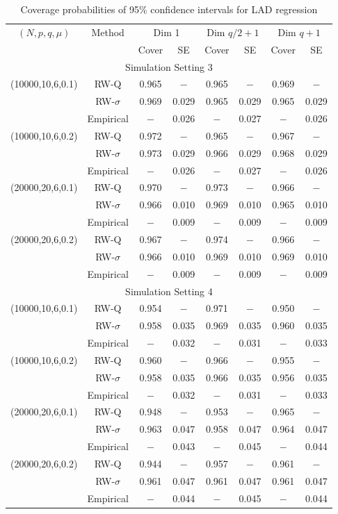 \documentclass[twoside,11pt]{article}
\begin{document}
\begin{table}[!h]
	\centering
	\caption{Coverage probabilities of 95\% confidence intervals for LAD regression}
	\medskip
	\label{tab:sim3}
	\begin{tabular}{cccccccc}
		\hline
		$(N, p, q, \mu)$ & Method & \multicolumn{2}{c}{Dim 1} & \multicolumn{2}{c}{Dim $q/2+1$} & \multicolumn{2}{c}{Dim $q+1$}\\
		& & Cover& SE& Cover& SE & Cover& SE\\
		\hline\hline
		\multicolumn{8}{c}{Simulation Setting 3}\\
		\hline
		(10000,10,6,0.1) & RW-Q & 0.965&$-$ &0.965&$-$ &0.969&$-$\\
		& RW-$\sigma$ & 0.969&0.029 &0.965& 0.029&0.965& 0.029\\
		& Empirical & $-$& 0.026&$-$ & 0.027&$-$& 0.026\\
		\hline
		(10000,10,6,0.2) &  RW-Q &0.972 & $-$&0.965 & $-$&0.967&$-$\\
		& RW-$\sigma$ & 0.973& 0.029& 0.966& 0.029&0.968 & 0.029\\
		& Empirical & $-$& 0.026&$-$ & 0.027&$-$& 0.026\\
		\hline
		(20000,20,6,0.1) & RW-Q & 0.970& $-$ &0.973 &$-$ &0.966 &$-$\\
		& RW-$\sigma$ & 0.966& 0.010&0.969 & 0.010&0.965& 0.010\\
		& Empirical & $-$& 0.009&$-$ & 0.009&$-$& 0.009\\
		\hline
		(20000,20,6,0.2)& RW-Q & 0.967& $-$&0.974& $-$ & 0.966&$-$\\
		& RW-$\sigma$ & 0.966& 0.010& 0.969& 0.010&0.969 & 0.010\\
		& Empirical & $-$& 0.009&$-$ & 0.009&$-$& 0.009\\
		\hline
		\multicolumn{8}{c}{Simulation Setting 4}\\
		\hline
		(10000,10,6,0.1) & RW-Q & 0.954&$-$ &0.971&$-$ &0.950 &$-$\\
		& RW-$\sigma$ & 0.958& 0.035&0.969&0.035 &0.960 &0.035\\
		&Empirical &$-$ &0.032&$-$ &0.031 &$-$ &0.033\\
		\hline
		(10000,10,6,0.2) &  RW-Q &0.960& $-$&0.966 &$-$&0.955&$-$ \\
		& RW-$\sigma$ & 0.958& 0.035& 0.966 & 0.035& 0.956& 0.035\\
		&Empirical &$-$ &0.032&$-$ &0.031 &$-$ &0.033\\
		\hline
		(20000,20,6,0.1) &  RW-Q & 0.948&$-$&0.953 &$-$ &0.965&$-$\\
		& RW-$\sigma$ &0.963&0.047 &0.958 & 0.047& 0.964& 0.047\\
		&Empirical &$-$ &0.043&$-$ &0.045 &$-$ &0.044\\
		\hline
		(20000,20,6,0.2) &  RW-Q & 0.944&$-$& 0.957 & $-$&0.961& $-$\\
		& RW-$\sigma$ &0.961& 0.047& 0.961& 0.047&0.961 & 0.047\\
		&Empirical &$-$ & 0.044&$-$ &0.045 &$-$ &0.044\\
		\hline
	\end{tabular}
\end{table}
\end{document}

